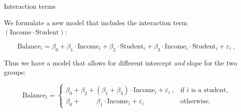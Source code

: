\documentclass[10pt,ignorenonframetext,]{beamer}
\begin{document}
\begin{frame}

\begin{block}{Interaction terms}

\vspace{2mm}

We formulate a new model that includes the interaction term
\((\text{Income}\cdot \text{Student})\):

\[\text{Balance}_i = \beta_0 + \beta_1 \cdot \text{Income}_i + \beta_2 \cdot \text{Student}_i + \beta_3 \cdot \text{Income}_i \cdot \text{Student}_i  + \varepsilon_i \ ,\]

Thus we have a model that allows for different intercept \emph{and}
slope for the two groups:

\begin{equation*}
\text{Balance}_i = \left\{ 
\begin{array}{ll}
\beta_0 + \beta_2 + (\beta_1 + \beta_3) \cdot \text{Income}_i  + \varepsilon_i \ ,  & \text{if $i$ is a student,}\\
\beta_0 + \qquad \; \beta_1 \cdot \text{Income}_i  + \varepsilon_i  & \text{otherwise.}
\end{array}
\right.
\end{equation*}

\end{block}

\end{frame}
\end{document}
